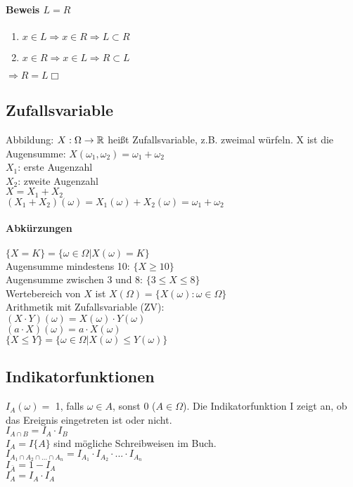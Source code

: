 \paragraph{Beweis $ L = R $}
\begin{enumerate}
\item $x \in L \Rightarrow x\in R \Rightarrow L \subset R $
\item $x \in R \Rightarrow x\in L \Rightarrow R \subset L $
\end{enumerate}
$\Rightarrow R=L \Box$\\

\subsection{Zufallsvariable}

Abbildung: $ X: \Omega \rightarrow \mathbb{R}$ heißt Zufallsvariable, z.B. zweimal würfeln. X ist die Augensumme: $ X(\omega_1, \omega_2) = \omega_1+\omega_2$\\
$ X_1$: erste Augenzahl\\
$ X_2$: zweite Augenzahl\\
$X = X_1+X_2$\\
$(X_1 + X_2)(\omega) = X_1(\omega) + X_2(\omega) = \omega_1 + \omega_2$\\

\paragraph{Abkürzungen}
$ \{X=K\} = \{\omega\in\Omega | X(\omega) = K\}$\\
Augensumme mindestens 10: $ \{X \geq 10\} $\\
Augensumme zwischen 3 und 8: $ \{3 \leq X \leq 8\}$\\
Wertebereich von $X$ ist $X(\Omega) = \{ X(\omega) : \omega \in \Omega \} $ \\
Arithmetik mit Zufallsvariable (ZV): \\
$ (X\cdot Y)(\omega) = X(\omega) \cdot Y(\omega)$\\
$ (a \cdot X)(\omega) = a \cdot X(\omega)$\\
$ \{X\leq Y\} = \{\omega\in\Omega | X(\omega) \leq Y(\omega) \}$\\
 
\subsection{Indikatorfunktionen}
$ I_{A}(\omega) = $ 1, falls $ \omega\in A $, sonst 0 ($A\in \Omega$). Die Indikatorfunktion I zeigt an, ob das Ereignis eingetreten ist oder nicht. \\
$ I_{A\cap B} = I_A \cdot I_B $\\
$ I_A = I\{A\} $ sind mögliche Schreibweisen im Buch.\\ 
$ I_{A_1\cap A_2\cap ... \cap A_n} = I_{A_1}\cdot I_{A_2}\cdot ... \cdot I_{A_n} $\\
$ I_{\bar{A}} = 1 - I_A $\\
$ I_A = I_A \cdot I_A$

